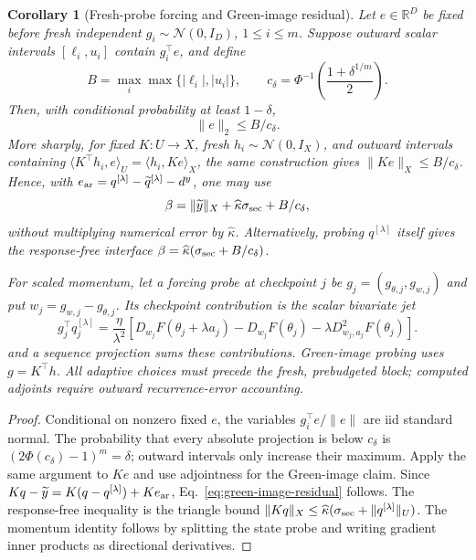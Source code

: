 \documentclass{article}
\newtheorem{corollary}{Corollary}
\newcommand{\R}{\mathbb{R}}
\begin{document}
\begin{corollary}[Fresh-probe forcing and Green-image residual]
\label{cor:residual-probe}
Let $e\in\R^D$ be fixed before fresh independent
$g_i\sim\mathcal N(0,I_D)$, $1\le i\le m$.  Suppose outward scalar intervals
$[\ell_i,u_i]$ contain $g_i^\top e$, and define
\begin{equation}
 B=\max_i\max\{|\ell_i|,|u_i|\},\qquad
 c_\delta=\Phi^{-1}\!\left(\frac{1+\delta^{1/m}}2\right).
 \label{eq:residual-probe}
\end{equation}
Then, with conditional probability at least $1-\delta$,
\begin{equation}
 \boxed{\|e\|_2\le B/c_\delta.}
 \label{eq:residual-probe-bound}
\end{equation}
More sharply, for fixed $K:U\to X$, fresh $h_i\sim\mathcal N(0,I_X)$, and
outward intervals containing
$\langle K^\top h_i,e\rangle_U=\langle h_i,Ke\rangle_X$, the same construction
gives $\|Ke\|_X\le B/c_\delta$.  Hence, with
$e_{\rm ar}=q^{[\lambda]}-\widetilde q^{[\lambda]}-d^y$, one may use
\begin{equation}
 \beta=\|\widetilde y\|_X+\widehat\kappa\sigma_{\rm sec}
       +B/c_\delta,
 \label{eq:green-image-residual}
\end{equation}
without multiplying numerical error by $\widehat\kappa$.  Alternatively,
probing $q^{[\lambda]}$ itself gives the response-free interface
$\beta=\widehat\kappa(\sigma_{\rm sec}+B/c_\delta)$.

For scaled momentum, let a forcing probe at checkpoint $j$ be
$g_j=(g_{\theta,j},g_{w,j})$ and put $w_j=g_{w,j}-g_{\theta,j}$.  Its
checkpoint contribution is the scalar bivariate jet
\begin{equation}
 g_j^\top q_j^{[\lambda]}=\frac{\eta}{\lambda^2}
 \left[D_{w_j}F(\theta_j+\lambda a_j)-D_{w_j}F(\theta_j)
 -\lambda D^2_{w_j,a_j}F(\theta_j)\right].
 \label{eq:scalar-secant-projection}
\end{equation}
and a sequence projection sums these contributions.  Green-image probing uses
$g=K^\top h$.  All adaptive choices must precede the fresh, prebudgeted block;
computed adjoints require outward recurrence-error accounting.
\end{corollary}

\begin{proof}
Conditional on nonzero fixed $e$, the variables $g_i^\top e/\|e\|$ are iid
standard normal.  The probability that every absolute projection is below
$c_\delta$ is $(2\Phi(c_\delta)-1)^m=\delta$; outward intervals only increase
their maximum.  Apply the same argument to $Ke$ and use adjointness for the
Green-image claim.  Since
$Kq-\widetilde y=K(q-q^{[\lambda]})+Ke_{\rm ar}$,
Eq.~\eqref{eq:green-image-residual} follows.  The response-free inequality is
the triangle bound $\|Kq\|_X\le\widehat\kappa
(\sigma_{\rm sec}+\|q^{[\lambda]}\|_U)$.  The momentum identity follows by
splitting the state probe and writing gradient inner products as directional
derivatives.
\end{proof}
\end{document}
